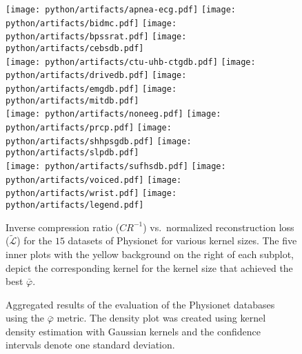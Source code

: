\documentclass[journal]{IEEEtran}
\begin{document}
\begin{figure*}[!t]
	\texttt{[image: python/artifacts/apnea-ecg.pdf]}
	\texttt{[image: python/artifacts/bidmc.pdf]}
	\texttt{[image: python/artifacts/bpssrat.pdf]}
	\texttt{[image: python/artifacts/cebsdb.pdf]}
	\\
	\texttt{[image: python/artifacts/ctu-uhb-ctgdb.pdf]}
	\texttt{[image: python/artifacts/drivedb.pdf]}
	\texttt{[image: python/artifacts/emgdb.pdf]}
	\texttt{[image: python/artifacts/mitdb.pdf]}
	\\
	\texttt{[image: python/artifacts/noneeg.pdf]}
	\texttt{[image: python/artifacts/prcp.pdf]}
	\texttt{[image: python/artifacts/shhpsgdb.pdf]}
	\texttt{[image: python/artifacts/slpdb.pdf]}
	\\
	\texttt{[image: python/artifacts/sufhsdb.pdf]}
	\texttt{[image: python/artifacts/voiced.pdf]}
	\texttt{[image: python/artifacts/wrist.pdf]}
	\texttt{[image: python/artifacts/legend.pdf]}
	\caption{Inverse compression ratio ($CR^{-1}$) vs.\ normalized reconstruction loss ($\tilde{\mathcal{L}}$) for the $15$ datasets of Physionet for various kernel sizes.
	The five inner plots with the yellow background on the right of each subplot, depict the corresponding kernel for the kernel size that achieved the best $\bar\varphi$.}\label{fig:crrl}
\end{figure*}

\begin{figure*}[!t]
	\centering
	\caption{Aggregated results of the evaluation of the Physionet databases using the $\bar\varphi$ metric.
	The density plot was created using kernel density estimation with Gaussian kernels and the confidence intervals denote one standard deviation.}\label{fig:flithos}
\end{figure*}
\end{document}
